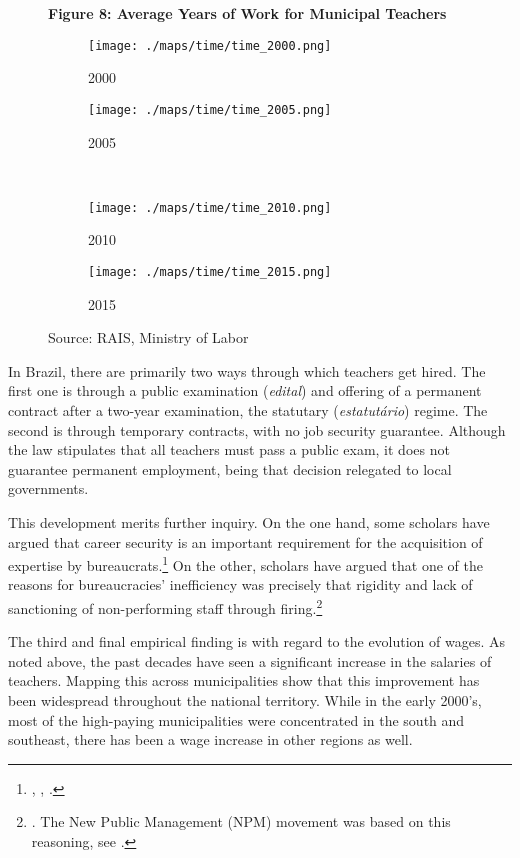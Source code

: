 \documentclass[12pt,]{book}
\let\rmarkdownfootnote\footnote%
\def\footnote{\protect\rmarkdownfootnote}
\begin{document}
\begin{figure}
    \centering
    \textbf{Figure 8: Average Years of Work for Municipal Teachers}
    \begin{subfigure}{0.4\textwidth}
        \centering 
        \texttt{[image: ./maps/time/time\_2000.png]}
        \caption{2000}
    \end{subfigure} %
    \begin{subfigure}{0.4\textwidth}
        \centering
        \texttt{[image: ./maps/time/time\_2005.png]}
        \caption{2005}
    \end{subfigure} \\
    \begin{subfigure}{0.4\textwidth}
        \centering
        \texttt{[image: ./maps/time/time\_2010.png]}
        \caption{2010}
    \end{subfigure} %
    \begin{subfigure}{0.4\textwidth}
        \centering
        \texttt{[image: ./maps/time/time\_2015.png]}
        \caption{2015}
    \end{subfigure}
    \caption*{\footnotesize \hfill Source: RAIS, Ministry of Labor}
\end{figure}

In Brazil, there are primarily two ways through which teachers get hired. The first one is through a public examination (\emph{edital}) and offering of a permanent contract after a two-year examination, the statutary (\emph{estatutário}) regime. The second is through temporary contracts, with no job security guarantee. Although the law stipulates that all teachers must pass a public exam, it does not guarantee permanent employment, being that decision relegated to local governments.

This development merits further inquiry. On the one hand, some scholars have argued that career security is an important requirement for the acquisition of expertise by bureaucrats.\footnote{\citet{gailmard_slackers_2007}, \citet{evans_embedded_1995}, \citet{fukuyama_what_2013}.} On the other, scholars have argued that one of the reasons for bureaucracies' inefficiency was precisely that rigidity and lack of sanctioning of non-performing staff through firing.\footnote{\citet{grindle_jobs_2012}. The New Public Management (NPM) movement was based on this reasoning, see \citet{osborne_new_2006}.}

The third and final empirical finding is with regard to the evolution of wages. As noted above, the past decades have seen a significant increase in the salaries of teachers. Mapping this across municipalities show that this improvement has been widespread throughout the national territory. While in the early 2000's, most of the high-paying municipalities were concentrated in the south and southeast, there has been a wage increase in other regions as well.
\end{document}
